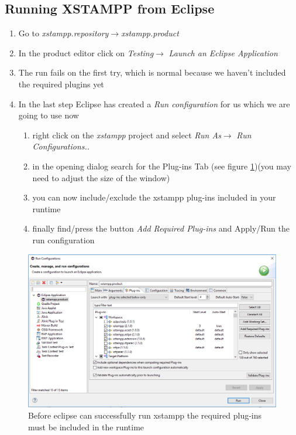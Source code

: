 \subsection{Running XSTAMPP from Eclipse}
\begin{enumerate}
\item Go to \textit{xstampp.repository}$\rightarrow$\textit{xstampp.product}
\item In the product editor click on  \textit{Testing}$\rightarrow$ \textit{Launch an Eclipse Application}
\item The run fails on the first try, which is normal because we haven't included the required plugins yet
\item In the last step Eclipse has created a \textit{Run configuration} for us which we are going to use now
	\begin{enumerate}
	\item right click on the \textit{xstampp} project and select \textit{Run As}$\rightarrow$ \textit{Run Configurations..}
	\item in the opening dialog search for the Plug-ins Tab (see figure \ref{fig:runConfig})(you may need to adjust the size of the window)
	\item you can now include/exclude the xstampp plug-ins included in your runtime
	\item finally find/press the button \textit{Add Required Plug-ins} and Apply/Run the run configuration
	\end{enumerate}
\end{enumerate}
\begin{figure}[H]
\includegraphics[scale=0.5]{images/runConfig.png}
\caption{Before eclipse can successfully run xstampp the required plug-ins must be included in the runtime}
\label{fig:runConfig}
\end{figure}

